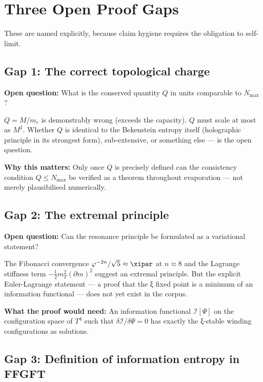 \section{Three Open Proof Gaps}

These are named explicitly, because claim hygiene requires the obligation to self-limit.

\subsection{Gap 1: The correct topological charge}

\textbf{Open question:} What is the conserved quantity $Q$ in units comparable to $N_\text{max}$?

$Q = M/m_e$ is demonstrably wrong (exceeds the capacity). $Q$ must scale at most as $M^2$. Whether $Q$ is identical to the Bekenstein entropy itself (holographic principle in its strongest form), sub-extensive, or something else --- is the open question.

\textbf{Why this matters:} Only once $Q$ is precisely defined can the consistency condition $Q \leq N_\text{max}$ be verified as a theorem throughout evaporation --- not merely plausibilised numerically.

\subsection{Gap 2: The extremal principle}

\textbf{Open question:} Can the resonance principle be formulated as a variational statement?

The Fibonacci convergence $\varphi^{-2n}/\sqrt{5} \approx \xipar$ at $n \approx 8$ and the Lagrange stiffness term $-\frac{1}{2}m_T^2(\partial m)^2$ suggest an extremal principle. But the explicit Euler-Lagrange statement --- a proof that the ξ fixed point is a minimum of an information functional --- does not yet exist in the corpus.

\textbf{What the proof would need:} An information functional $\mathcal{I}[\Psi]$ on the configuration space of $T^4$ such that $\delta\mathcal{I}/\delta\Psi = 0$ has exactly the ξ-stable winding configurations as solutions.

\subsection{Gap 3: Definition of information entropy in FFGFT}

